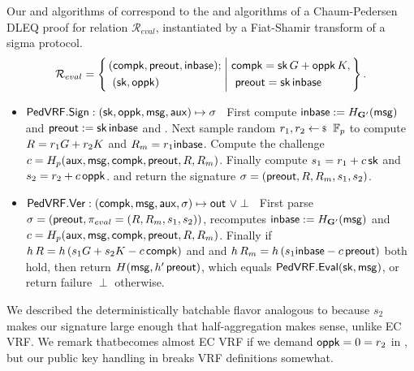 Our \Sign and \Verify algorithms of \PedVRF correspond to
the \Prove and \Verify algorithms of a Chaum-Pedersen DLEQ proof
 for relation $\mathcal{R}_{eval}$,
instantiated by a Fiat-Shamir transform of a sigma protocol.
$$ \mathcal{R}_{eval} = \Setst{
  \begin{aligned}
    & (\compk,\PreOut,\In) ; \\ 
    & \,\, (\sk, \openpk) 
  \end{aligned}
}{
  \begin{aligned}
    & \compk = \sk\,\genG + \openpk\,\genB, \\
    & \,\, \PreOut = \sk\,\In 
  \end{aligned}
}  \mathperiod \label{rel:commit} 
$$
%
\begin{itemize}
	\item ${\mathsf{PedVRF}}.{\mathsf{Sign}} : (\mathsf{sk},\mathsf{oppk},\mathsf{msg},\mathsf{aux}) \mapsto \sigma$ \,
	First compute ${\mathsf{inbase}} := H_{{\mathbf{G}'}}(\mathsf{msg})$ and ${\mathsf{preout}} := \mathsf{sk} \, {\mathsf{inbase}}$ and \compk.
	Next sample random $r_1,r_2 \leftsample \F_p$
	to compute $R = r_1 G + r_2 K$ and $R_m = r_1 {\mathsf{inbase}}$.
	Compute the challenge $c = H_p(\mathsf{aux},\mathsf{msg},\mathsf{compk},{\mathsf{preout}},R,R_m)$.
	Finally compute $s_1 = r_1 + c \, \mathsf{sk}$ and $s_2 = r_2 + c \, \mathsf{oppk}$.
	and return the signature $\sigma = ({\mathsf{preout}},R,R_m,s_1,s_2)$.

	\item ${\mathsf{PedVRF}}.{\mathsf{Ver}} : (\mathsf{compk},\mathsf{msg},\mathsf{aux},\sigma) \mapsto {\ensuremath{\mathsf{out}}} \,\, \lor \perp$ \,
	First parse $\sigma = ({\mathsf{preout}}, \pi_{eval} = (R,R_m,s_1,s_2))$,
	recomputes ${\mathsf{inbase}} := H_{{\mathbf{G}'}}(\mathsf{msg})$ and 
	$c = H_p(\mathsf{aux},\mathsf{msg},\mathsf{compk},{\mathsf{preout}},R,R_m)$.
    Finally if $h \, R = h \, (s_1 G + s_2 K - c \, \mathsf{compk})$ and
    and $h \, R_m = h \, (s_1 {\mathsf{inbase}} - c \, {\mathsf{preout}})$ both hold,
    then return $H(\mathsf{msg}, {h'}\,{\mathsf{preout}})$, which equals ${\mathsf{PedVRF}}.{\mathsf{Eval}}(\mathsf{sk},\mathsf{msg})$,
    or return failure $\perp$ otherwise.
\end{itemize}
\noindent We described the deterministically batchable flavor analogous
to \cite{HdVBatchEd25519} because $s_2$ makes our signature large enough
that half-aggregation makes sense, unlike EC VRF.
We remark that\PedVRF becomes almost EC VRF if
 we demand $\mathsf{oppk} = 0 = r_2$ in \Sign,
but our public key handling in \PedVRF breaks VRF definitions somewhat.

